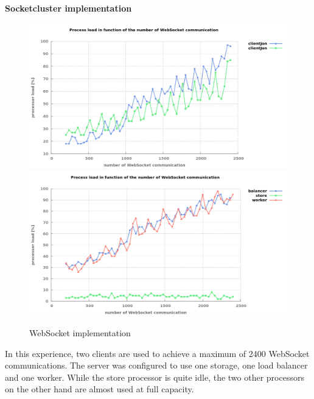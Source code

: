 \textbf{Socketcluster implementation}

\begin{figure}[H]
	\centering
		\includegraphics[width=\textwidth]{./Figures/WS_client_comparaison.png}
		\includegraphics[width=\textwidth]{./Figures/WS_server_comparaison.png}
	\caption[WebSocket implementation]{WebSocket implementation}
	\label{fig:WS_comparaison}
\end{figure}

In this experience, two clients are used to achieve a maximum of 2400 WebSocket
communications.  The server was configured to use one storage, one load
balancer and one worker. While the store processor is quite idle, the two other
processors on the other hand are almost used at full capacity.


